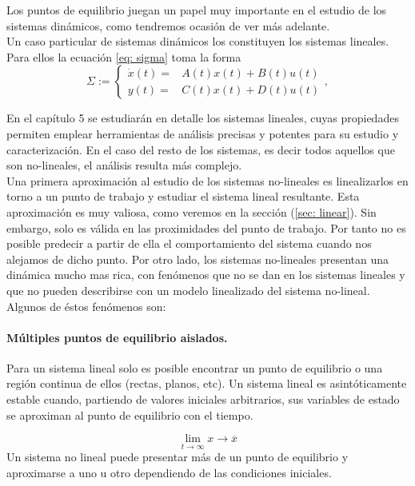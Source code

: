 Los puntos de equilibrio juegan un papel muy importante en el estudio de los sistemas dinámicos, como tendremos ocasión de ver más adelante.\\

Un caso particular de sistemas dinámicos los constituyen los sistemas lineales. Para ellos la ecuación \ref{eq: sigma} toma la forma
\begin{equation}
	\Sigma := \begin{cases}
		\dot x(t) =& A(t)x(t)+B(t)u(t) \\ y(t) =& C(t)x(t)+D(t)u(t)
	\end{cases}, 
\label{eq: sigmaL}
\end{equation}

En el capítulo 5 se estudiarán en detalle los sistemas lineales, cuyas propiedades permiten emplear herramientas de análisis precisas y potentes para su estudio y caracterización. En el caso del resto de los sistemas, es decir todos aquellos que son no-lineales, el análisis resulta más complejo.\\

Una primera aproximación al estudio de los sistemas no-lineales es linealizarlos en torno a un punto de trabajo y estudiar el sistema lineal resultante. Esta aproximación es muy valiosa, como veremos en la sección (\ref{sec: linear}). Sin embargo, solo es válida en las proximidades del punto de trabajo. Por tanto no es posible predecir a partir de ella el comportamiento del sistema cuando nos alejamos de dicho punto. Por otro lado, los sistemas no-lineales presentan una dinámica mucho mas rica, con fenómenos que no se dan en los sistemas lineales y que no pueden describirse con un modelo linealizado del sistema no-lineal. Algunos de éstos fenómenos son:

\paragraph{Múltiples puntos de equilibrio aislados.} Para un sistema lineal solo es posible encontrar un punto de equilibrio o una región continua de ellos (rectas, planos, etc).  Un sistema lineal es asintóticamente estable cuando, partiendo de valores iniciales arbitrarios, sus variables de estado se aproximan al punto de equilibrio con el tiempo. 

\begin{equation}
\lim_{ t \to \infty} x \to \overline x
\end{equation}
Un sistema no lineal puede presentar más de un punto de equilibrio y aproximarse a uno u otro dependiendo de las condiciones iniciales.

